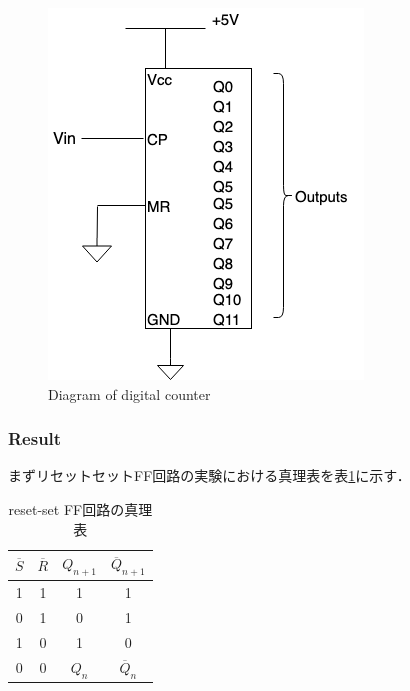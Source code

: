 \documentclass[11pt, a4paper,twocolumn]{jarticle}
\begin{document}
\begin{figure}[htbp]
 \begin{center}
  \includegraphics[width=0.8\linewidth]{fig16.png}
 \end{center}
 \caption{Diagram of digital counter}
 \label{fig:16}
\end{figure}
\newpage

\subsubsection{Result}
まずリセットセットFF回路の実験における真理表を表\ref{tab:2}に示す．

\begin{table}[htb]
  \begin{center}
    \caption{reset-set FF回路の真理表}
    \begin{tabular}{c c c c} \hline
         $\overline{S}$ & $\overline{R}$ & $Q_{n+1}$ & $\overline{Q}_{n+1}$ \\ \hline \hline
         1 & 1 & 1 & 1 \\ \hline
         0 & 1 & 0 & 1 \\ \hline
         1 & 0 & 1 & 0 \\ \hline
         0 & 0 & $Q_{n}$ & $\overline{Q}_{n}$ \\ \hline
    \end{tabular}
    \label{tab:2}
  \end{center}
\end{table}
\end{document}
